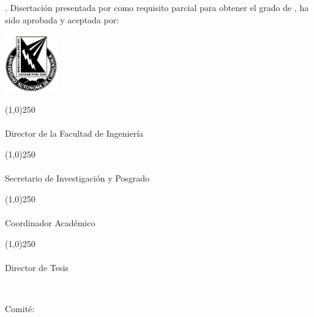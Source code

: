 
\newpage
\thispagestyle{empty}

\noindent
\justify
\vTitulo. Disertación presentada por \vAutor como requisito parcial para obtener el grado de \vGrado, ha sido aprobada y aceptada por:

\vspace*{-1.8cm}
\hspace*{-3.5cm}
\includegraphics[keepaspectratio=true,height=2.5cm]{template/uach.png}
\vspace*{1cm}

\noindent\line(1,0){250} \\
\textbf{\vFDirector} \\
Director de la Facultad de Ingeniería \\

\vspace*{8mm}

\noindent\line(1,0){250} \\
\textbf{\vFSecretario} \\
Secretario de Investigación y Posgrado \\

\vspace*{6mm}

\noindent\line(1,0){250} \\
\textbf{\vFCoordinador} \\
Coordinador Académico \\

\vspace*{6mm}

\noindent\line(1,0){250} \\
\textbf{\vDirectorTesis} \\
Director de Tesis \\

\vspace*{6mm}

\noindent
\textbf{\vFecha} \\

\vspace*{6mm}

\noindent
Comité: \\

\vComite

\vspace*{2cm}

\hspace*{8cm}

\restoregeometry    